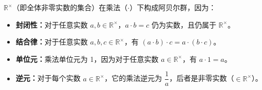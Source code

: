 \noindent $\mathbb{R}^\times$（即全体非零实数的集合）在乘法（$\cdot$）下构成阿贝尔群，因为：
\begin{itemize}
\item \textbf{封闭性：}对于任意实数 $a, b \in \mathbb{R}^\times$，$a \cdot b = c$ 仍为实数，且仍属于 $\mathbb{R}^\times$。
\item \textbf{结合律：}对于任意实数 $a, b, c \in \mathbb{R}^\times$，有 $(a \cdot b) \cdot c = a \cdot (b \cdot c)$。
\item \textbf{单位元：}乘法单位元为 1，因为对于任意实数 $a \in \mathbb{R}^\times$，有 $a \cdot 1 = a$。
\item \textbf{逆元：}对于每个实数 $a \in \mathbb{R}^\times$，它的乘法逆元为 $\dfrac{1}{a}$，后者是非零实数（$\in \mathbb{R}^{\times}$）。
\end{itemize}